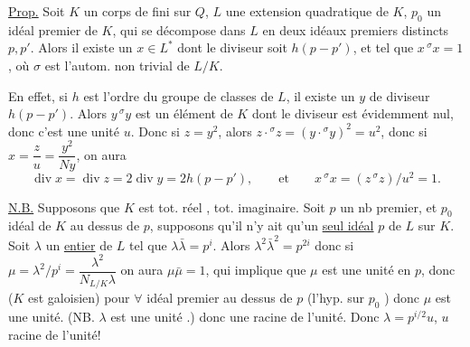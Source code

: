 
\uline{Prop.} Soit $K$ un corps de  fini sur $Q$, $L$ une extension quadratique de $K$, $p_0$ un idéal premier de $K$,  qui se décompose dans $L$ en deux idéaux premiers distincts $p,p'$. Alors il existe un $x\in L^*$   dont le diviseur soit $h(p-p')$,  et tel que $x\,{}^\sigma x=1$, où $\sigma$ est l'autom. non trivial de $L/K$.


En effet,  si $h$ est l'ordre du groupe de classes  de $L$, il existe un $y$ de diviseur $h(p-p')$. Alors $y\,{}^\sigma y$ est un élément de $K$ dont le diviseur est évidemment nul, donc c'est une unité $u$.
Donc si $z=y^2$, alors  $z\cdot{}^\sigma z=(y\cdot{}^\sigma y)^2=u^2$, donc si $x=\dfrac{z}{u}=\dfrac{y^2}{Ny}$, on aura
\[
\operatorname{div}x=\operatorname{div}z=2\operatorname{div}y=2h(p-p'),\qquad\text{et}\qquad x\,{}^\sigma x=(z\,{}^\sigma z)/u^2=1.
\]

\uline{N.B.} Supposons que $K$ est tot. réel ,    tot. imaginaire. Soit $p$ un nb premier, et $p_0$ idéal de $K$ au dessus de $p$, supposons qu'il n'y ait qu'un \uline{seul idéal}  $p$  de $L$ sur $K$. Soit $\lambda$ un \uline{entier} de $L$ tel que $\lambda\bar\lambda=p^i$. Alors $\lambda^2\bar\lambda^2=p^{2i}$ donc si $\mu=\lambda^2/p^i=\dfrac{\lambda^2}{N_{L/K}\lambda}$ on aura $\mu\bar\mu=1$,  qui implique que $\mu$ est une unité en $p$, donc ($K$ est galoisien) pour $\forall$ idéal premier au dessus de $p$  (l'hyp. sur $p_0$ ) donc $\mu$ est une unité. (NB. $\lambda$  est une unité .) donc une racine de l'unité. Donc $\lambda=p^{i/2}u$, $u$ racine de l'unité!

